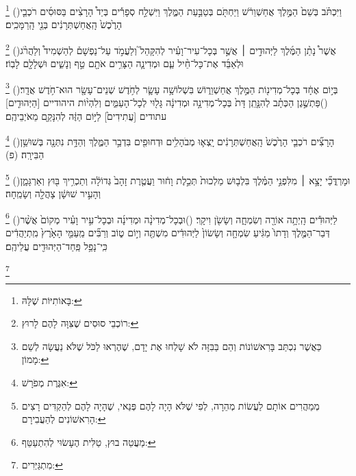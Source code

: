 \documentclass[12pt, openany]{book}
\newcommand{\footnotecomment}[1]{
	\renewcommand\thefootnote{}
	\footnote{\textsf{#1}}}
\newcommand{\commenta}[1]{\footnotecomment{#1}\hspace{0em}}
\newcommand{\vsnum}[1]{(\hebrewnumeral{#1})\space}
\begin{document}
\begin{multicols}{2}
\commenta{ בָּאוֹתִיּוֹת שֶׁלָּהּ:}%
\vsnum{10}וַיִּכְתֹּ֗ב בְּשֵׁם֙ הַמֶּ֣לֶךְ אֲחַשְׁוֵרֹ֔שׁ וַיַּחְתֹּ֖ם בְּטַבַּ֣עַת הַמֶּ֑לֶךְ וַיִּשְׁלַ֣ח סְפָרִ֡ים בְּיַד֩ הָרָצִ֨ים בַּסּוּסִ֜ים רֹכְבֵ֤י הָרֶ֙כֶשׁ֙ הָֽאֲחַשְׁתְּרָנִ֔ים בְּנֵ֖י הָֽרַמָּכִֽים׃%
\commenta{ רוֹכְבֵי סוּסִים שֶׁצִּוָּה לָהֶם לָרוּץ:}%
\vsnum{11}אֲשֶׁר֩ נָתַ֨ן הַמֶּ֜לֶךְ לַיְּהוּדִ֣ים ׀ אֲשֶׁ֣ר בְּכָל־עִיר־וָעִ֗יר לְהִקָּהֵל֮ וְלַעֲמֹ֣ד עַל־נַפְשָׁם֒ לְהַשְׁמִיד֩ וְלַהֲרֹ֨ג וּלְאַבֵּ֜ד אֶת־כָּל־חֵ֨יל עַ֧ם וּמְדִינָ֛ה הַצָּרִ֥ים אֹתָ֖ם טַ֣ף וְנָשִׁ֑ים וּשְׁלָלָ֖ם לָבֽוֹז׃%
\commenta{ כַּאֲשֶׁר נִכְתַּב בָּרִאשׁוֹנוֹת וְהֵם בַּבִּזָּה לֹא שָׁלְחוּ אֶת יָדָם, שֶׁהֶרְאוּ לַכֹּל שֶׁלֹּא נַעֲשָׂה לְשֵׁם מָמוֹן: }%
\vsnum{12}בְּי֣וֹם אֶחָ֔ד בְּכָל־מְדִינ֖וֹת הַמֶּ֣לֶךְ אֲחַשְׁוֵר֑וֹשׁ בִּשְׁלוֹשָׁ֥ה עָשָׂ֛ר לְחֹ֥דֶשׁ שְׁנֵים־עָשָׂ֖ר הוּא־חֹ֥דֶשׁ אֲדָֽר׃
\vsnum{13}פַּתְשֶׁ֣גֶן הַכְּתָ֗ב לְהִנָּ֤תֵֽן דָּת֙ בְּכָל־מְדִינָ֣ה וּמְדִינָ֔ה גָּל֖וּי לְכָל־הָעַמִּ֑ים וְלִהְי֨וֹת היהודיים [הַיְּהוּדִ֤ים] עתודים [עֲתִידִים֙] לַיּ֣וֹם הַזֶּ֔ה לְהִנָּקֵ֖ם מֵאֹיְבֵיהֶֽם׃%
\commenta{ אִגֶּרֶת מְפֹרָשׁ:}%
\vsnum{14}הָרָצִ֞ים רֹכְבֵ֤י הָרֶ֙כֶשׁ֙ הָֽאֲחַשְׁתְּרָנִ֔ים יָֽצְא֛וּ מְבֹהָלִ֥ים וּדְחוּפִ֖ים בִּדְבַ֣ר הַמֶּ֑לֶךְ וְהַדָּ֥ת נִתְּנָ֖ה בְּשׁוּשַׁ֥ן הַבִּירָֽה׃ (פ)%
\commenta{ מְמַהֲרִים אוֹתָם לַעֲשׂוֹת מְהֵרָה, לְפִי שֶׁלֹּא הָיָה לָהֶם פְּנַאי, שֶׁהָיָה לָהֶם לְהַקְדִּים רָצִים הָרִאשׁוֹנִים לְהַעֲבִירָם: }%
\vsnum{15}וּמָרְדֳּכַ֞י יָצָ֣א ׀ מִלִּפְנֵ֣י הַמֶּ֗לֶךְ בִּלְב֤וּשׁ מַלְכוּת֙ תְּכֵ֣לֶת וָח֔וּר וַעֲטֶ֤רֶת זָהָב֙ גְּדוֹלָ֔ה וְתַכְרִ֥יךְ בּ֖וּץ וְאַרְגָּמָ֑ן וְהָעִ֣יר שׁוּשָׁ֔ן צָהֲלָ֖ה וְשָׂמֵֽחָה׃%
\commenta{ מַעֲטֵה בוּץ, טַלִּית הֶעָשׂוּי לְהִתְעַטֵּף: }%
\vsnum{16}לַיְּהוּדִ֕ים הָֽיְתָ֥ה אוֹרָ֖ה וְשִׂמְחָ֑ה וְשָׂשֹׂ֖ן וִיקָֽר׃
\vsnum{17}וּבְכָל־מְדִינָ֨ה וּמְדִינָ֜ה וּבְכָל־עִ֣יר וָעִ֗יר מְקוֹם֙ אֲשֶׁ֨ר דְּבַר־הַמֶּ֤לֶךְ וְדָתוֹ֙ מַגִּ֔יעַ שִׂמְחָ֤ה וְשָׂשׂוֹן֙ לַיְּהוּדִ֔ים מִשְׁתֶּ֖ה וְי֣וֹם ט֑וֹב וְרַבִּ֞ים מֵֽעַמֵּ֤י הָאָ֙רֶץ֙ מִֽתְיַהֲדִ֔ים כִּֽי־נָפַ֥ל פַּֽחַד־הַיְּהוּדִ֖ים עֲלֵיהֶֽם׃%
\commenta{ מִתְגַּיְּרִים:}%
\end{multicols}\clearpage
\end{document}
